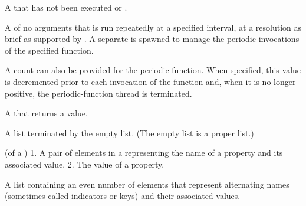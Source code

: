 \begin{glossary-list}

%
%
%
%
%
A  that has not been executed or .


%
%

A  of no arguments that is run repeatedly at a specified
interval, at a resolution as brief as supported by . A separate
 is spawned to manage the periodic invocations of the specified
function.

A count can also be provided for the periodic function. When specified, this
value is decremented prior to each invocation of the function and, when it is
no longer positive, the periodic-function thread is terminated.


%
%
%
A  that returns a  value.


%
%
A list terminated by the empty list. (The empty list is a proper list.)


\glent[property]
%
(of a ) 1. A pair of elements in a 
representing the name of a property and its associated value. 2. The value of
a property.


%
%
A list containing an even number of elements that represent alternating names
(sometimes called indicators or keys) and their associated values.



\end{glossary-list}
